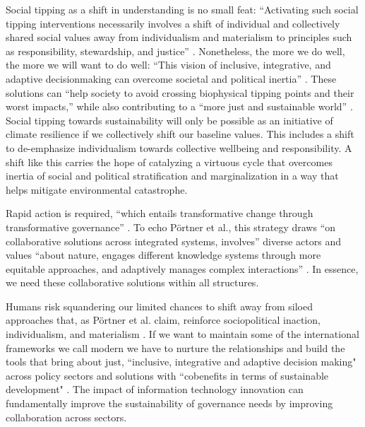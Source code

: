 Social tipping as a shift in understanding is no small feat: “Activating such social tipping interventions necessarily involves a shift of individual and collectively shared social values away from individualism and materialism to principles such as responsibility, stewardship, and justice” \citep[p. 7]{portner_overcoming_2023}. Nonetheless, the more we do well, the more we will want to do well: “This vision of inclusive, integrative, and adaptive decisionmaking can overcome societal and political inertia” \citep[p. 8]{portner_overcoming_2023}. These solutions can “help society to avoid crossing biophysical tipping points and their worst impacts,” while also contributing to a “more just and sustainable world” \citep[p. 8]{portner_overcoming_2023}. Social tipping towards sustainability will only be possible as an initiative of climate resilience if we collectively shift our baseline values. This includes a shift to de-emphasize individualism towards collective wellbeing and responsibility. A shift like this carries the hope of catalyzing a virtuous cycle that overcomes inertia of social and political stratification and marginalization in a way that helps mitigate environmental catastrophe. 

Rapid action is required, “which entails transformative change through transformative governance” \citep[p. 7]{portner_overcoming_2023}. To echo Pörtner et al., this strategy draws “on collaborative solutions across integrated systems, involves” diverse actors and values “about nature, engages different knowledge systems through more equitable approaches, and adaptively manages complex interactions” \citep[p. 7]{portner_overcoming_2023}. In essence, we need these collaborative solutions within all structures.

Humans risk squandering our limited chances to shift away from siloed approaches that, as Pörtner et al. claim, reinforce sociopolitical inaction, individualism, and materialism \citep[p. 7]{portner_overcoming_2023}. If we want to maintain some of the international frameworks we call modern we have to nurture the relationships and build the tools that bring about just, ``inclusive, integrative and adaptive decision making" across policy sectors and solutions with ``cobenefits in terms of sustainable development" \citep[p. 7-8]{portner_overcoming_2023}. The impact of information technology innovation can fundamentally improve the sustainability of governance needs by improving collaboration across sectors. 


